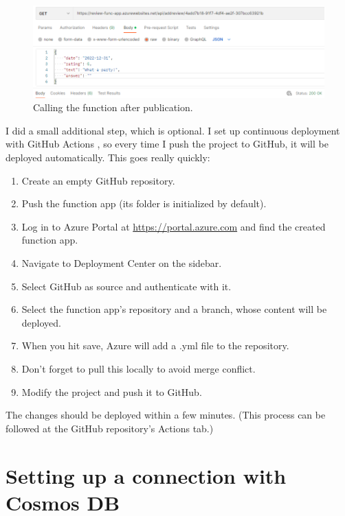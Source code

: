 \begin{figure}[!ht]
	\centering
	\includegraphics[width=150mm, keepaspectratio]{figures/7_published_response.png}
	\caption{Calling the function after publication.}
	\label{fig:res_pub}
\end{figure}

I did a small additional step, which is optional. I set up continuous deployment with GitHub Actions \cite{GitHubActionsForFunctions}, so every time I push the project to GitHub, it will be deployed automatically. This goes really quickly:

\begin{enumerate}
	\item Create an empty GitHub repository.
	\item Push the function app (its folder is initialized by default).
	\item Log in to Azure Portal at \url{https://portal.azure.com} and find the created function app.
	\item Navigate to Deployment Center on the sidebar.
	\item Select GitHub as source and authenticate with it.
	\item Select the function app's repository and a branch, whose content will be deployed.
	\item When you hit save, Azure will add a .yml file to the repository.
	\item Don't forget to pull this locally to avoid merge conflict.
	\item Modify the project and push it to GitHub.
\end{enumerate}

The changes should be deployed within a few minutes. (This process can be followed at the GitHub repository's Actions tab.)

\section{Setting up a connection with Cosmos DB}

